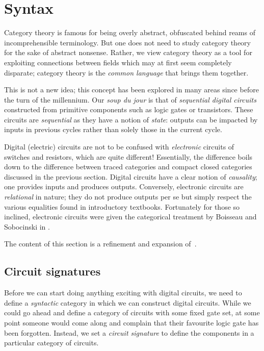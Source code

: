 \chapter{Syntax}

Category theory is famous for being overly abstract, obfuscated
behind reams of incomprehensible terminology.
But one does not need to study category theory for the sake of abstract
nonsense.
Rather, we view category theory as a tool for exploiting connections
between fields which may at first seem completely disparate; category theory is
the \emph{common language} that brings them together.

This is not a new idea; this concept has been explored in many areas since
before the turn of the millennium.
Our \emph{soup du jour} is that of \emph{sequential digital circuits}
constructed from primitive components such as logic gates or transistors.
These circuits are \emph{sequential} as they have a notion of \emph{state}:
outputs can be impacted by inputs in previous cycles rather than solely those in
the current cycle.

\begin{remark}
    Digital (electric) circuits are not to be confused with \emph{electronic}
    circuits of switches and resistors, which are quite different!
    Essentially, the difference boils down to the difference between traced
    categories and compact closed categories discussed in the previous section.
    Digital circuits have a clear notion of \emph{causality}; one provides
    inputs and produces outputs.
    Conversely, electronic circuits are \emph{relational} in nature; they do not
    produce outputs per se but simply respect the various equalities found in
    introductory textbooks.
    Fortunately for those so inclined, electronic circuits were given the
    categorical treatment by Boisseau and Sobocinski in
    \cite{boisseau2022string}.
\end{remark}

\begin{remark}
    The content of this section is a refinement and expansion
    of~\cite[Section 2]{ghica2024fully}.
\end{remark}

\section{Circuit signatures}

Before we can start doing anything exciting with digital circuits, we need to
define a \emph{syntactic} category in which we can construct digital circuits.
While we could go ahead and define a category of circuits with some fixed gate
set, at some point someone would come along and complain that their favourite
logic gate has been forgotten.
Instead, we set a \emph{circuit signature} to define the components in a
particular category of circuits.

